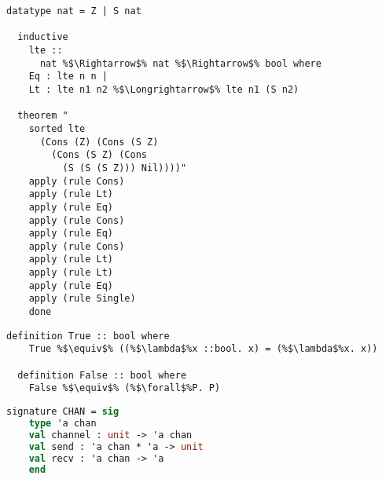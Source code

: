 \begin{lstlisting}[style=codestyle1, escapechar=\%]
  datatype nat = Z | S nat 

  inductive
    lte ::
      nat %$\Rightarrow$% nat %$\Rightarrow$% bool where
    Eq : lte n n |
    Lt : lte n1 n2 %$\Longrightarrow$% lte n1 (S n2)

  theorem "
    sorted lte
      (Cons (Z) (Cons (S Z)
        (Cons (S Z) (Cons
          (S (S (S Z))) Nil))))"
    apply (rule Cons)
    apply (rule Lt)
    apply (rule Eq)
    apply (rule Cons)
    apply (rule Eq)
    apply (rule Cons)
    apply (rule Lt)
    apply (rule Lt)
    apply (rule Eq)
    apply (rule Single)
    done
  \end{lstlisting}

\begin{lstlisting}[style=codestyle1, escapechar=\%]
  definition True :: bool where 
    True %$\equiv$% ((%$\lambda$%x ::bool. x) = (%$\lambda$%x. x))

  definition False :: bool where 
    False %$\equiv$% (%$\forall$%P. P)

  \end{lstlisting}

\begin{lstlisting}[language=ML, style=codestyle1]
  signature CHAN = sig
    type 'a chan 
    val channel : unit -> 'a chan
    val send : 'a chan * 'a -> unit
    val recv : 'a chan -> 'a
    end     
\end{lstlisting}

